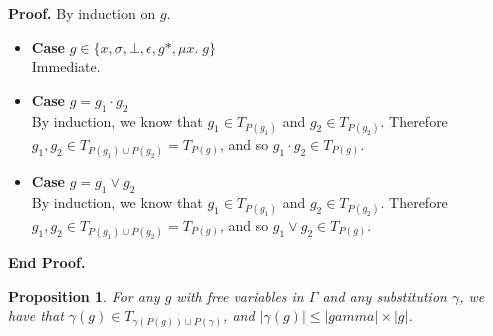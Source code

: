 \documentclass{article}
\newcommand{\fix}[2]{\mu {#1}.\;{#2}}
\newcommand{\setof}[1]{\{{#1}\}}
\newcommand{\pieces}[1]{P({#1})}
\newtheorem{prop}{Proposition}
\newenvironment{proof}{\noindent\textbf{Proof.}}{\noindent\textbf{End Proof.}}
\newenvironment{caseblock}{\begin{itemize}}{\end{itemize}}
\newenvironment{case}[1]{\item \textbf{Case} {#1}\\}{}
\begin{document}
\begin{proof}
  By induction on $g$. 

  \begin{caseblock}
    \begin{case}{$g \in \setof{x, \sigma, \bot, \epsilon, g*, \fix{x}{g}}$}
      Immediate. 
    \end{case}
    
    \begin{case}{$g = g_1 \cdot g_2$}
      By induction, we know that $g_1 \in T_{\pieces{g_1}}$ and $g_2 \in T_{\pieces{g_2}}$. 
      Therefore $g_1, g_2 \in T_{\pieces{g_1} \cup \pieces{g_2}} = T_{\pieces{g}}$, and so $g_1 \cdot g_2 \in T_{\pieces{g}}$. 
    \end{case}

    \begin{case}{$g = g_1 \vee g_2$}
      By induction, we know that $g_1 \in T_{\pieces{g_1}}$ and $g_2 \in T_{\pieces{g_2}}$. 
      Therefore $g_1, g_2 \in T_{\pieces{g_1} \cup \pieces{g_2}} = T_{\pieces{g}}$, and so $g_1 \vee g_2 \in T_{\pieces{g}}$. 
    \end{case}
  \end{caseblock}
\end{proof}

\begin{prop}{}
  For any $g$ with free variables in $\Gamma$ and any substitution $\gamma$, we 
  have that $\gamma(g) \in T_{\gamma(\pieces{g}) \cup \pieces{\gamma}}$, and $|\gamma(g)| \leq |gamma| \times |g|$. 
\end{prop}
\end{document}
